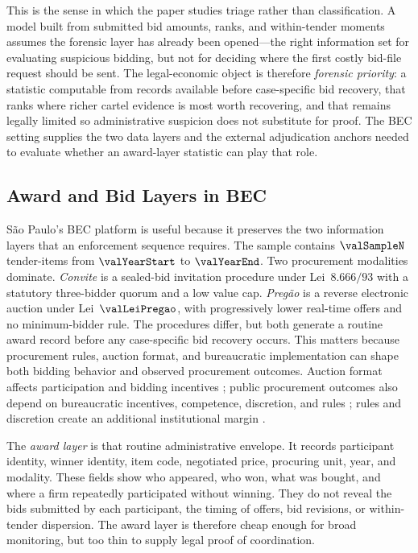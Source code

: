 This is the sense in which the paper studies triage rather than
classification. A model built from submitted bid amounts, ranks,
and within-tender moments assumes the forensic layer has already
been opened---the right information set for evaluating suspicious
bidding, but not for deciding where the first costly bid-file
request should be sent. The legal-economic object is therefore
\emph{forensic priority}: a statistic computable from records
available before case-specific bid recovery, that ranks where
richer cartel evidence is most worth recovering, and that remains
legally limited so administrative suspicion does not substitute
for proof. The BEC setting supplies the two data layers and the
external adjudication anchors needed to evaluate whether an
award-layer statistic can play that role.

\subsection{Award and Bid Layers in BEC}
\label{sec:data_layers_bec}

S\~ao Paulo's BEC platform is useful because it preserves the
two information layers that an enforcement sequence requires.
The sample contains $\valSampleN$ tender-items from
$\valYearStart$ to $\valYearEnd$. Two procurement modalities
dominate. \emph{Convite} is a sealed-bid invitation procedure
under Lei~$8.666/93$ with a statutory three-bidder quorum and a
low value cap. \emph{Preg\~ao} is a reverse electronic auction
under Lei~$\valLeiPregao$, with progressively lower real-time
offers and no minimum-bidder rule. The procedures differ, but
both generate a routine award record before any case-specific
bid recovery occurs. This matters because procurement rules,
auction format, and bureaucratic implementation can shape both
bidding behavior and observed procurement outcomes. Auction
format affects participation and bidding incentives
\citep{athey2011comparing,decarolis2014awarding}; public
procurement outcomes also depend on bureaucratic incentives,
competence, discretion, and rules
\citep{coviello2017tenure,decarolis2020bureaucratic}; rules and
discretion create an additional institutional margin
\citep{decarolis2020rules}.

The \emph{award layer} is that routine administrative envelope.
It records participant identity, winner identity, item code,
negotiated price, procuring unit, year, and modality. These
fields show who appeared, who won, what was bought, and where a
firm repeatedly participated without winning. They do
not reveal the bids submitted by each participant, the timing of
offers, bid revisions, or within-tender dispersion. The award
layer is therefore cheap enough for broad monitoring, but too
thin to supply legal proof of coordination.

